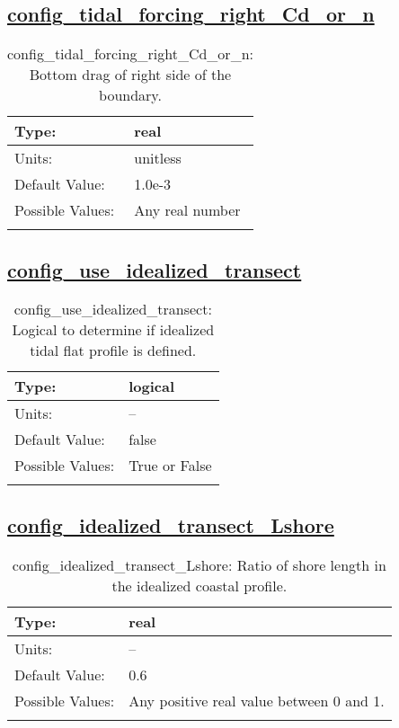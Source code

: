 \subsection[config\_tidal\_forcing\_right\_Cd\_or\_n]{\hyperref[sec:nm_tab_tidal_boundary]{config\_tidal\_forcing\_right\_Cd\_or\_n}}
\label{subsec:nm_sec_config_tidal_forcing_right_Cd_or_n}
\begin{center}
\begin{longtable}{| p{2.0in} || p{4.0in} |}
    \hline
    Type: & real \\
    \hline
    Units: & \si{unitless} \\
    \hline
    Default Value: & 1.0e-3 \\
    \hline
    Possible Values: & Any real number \\
    \hline
    \caption{config\_tidal\_forcing\_right\_Cd\_or\_n: Bottom drag of right side of the boundary.}
\end{longtable}
\end{center}
\subsection[config\_use\_idealized\_transect]{\hyperref[sec:nm_tab_tidal_boundary]{config\_use\_idealized\_transect}}
\label{subsec:nm_sec_config_use_idealized_transect}
\begin{center}
\begin{longtable}{| p{2.0in} || p{4.0in} |}
    \hline
    Type: & logical \\
    \hline
    Units: & -- \\
    \hline
    Default Value: & false \\
    \hline
    Possible Values: & True or False \\
    \hline
    \caption{config\_use\_idealized\_transect: Logical to determine if idealized tidal flat profile is defined.}
\end{longtable}
\end{center}
\subsection[config\_idealized\_transect\_Lshore]{\hyperref[sec:nm_tab_tidal_boundary]{config\_idealized\_transect\_Lshore}}
\label{subsec:nm_sec_config_idealized_transect_Lshore}
\begin{center}
\begin{longtable}{| p{2.0in} || p{4.0in} |}
    \hline
    Type: & real \\
    \hline
    Units: & -- \\
    \hline
    Default Value: & 0.6 \\
    \hline
    Possible Values: & Any positive real value between 0 and 1. \\
    \hline
    \caption{config\_idealized\_transect\_Lshore: Ratio of shore length in the idealized coastal profile.}
\end{longtable}
\end{center}
